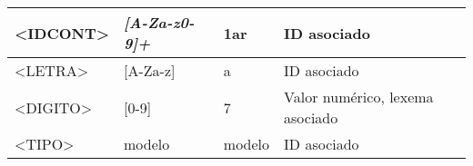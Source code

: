 \begin{landscape}
\begin{longtable}{| p{0.2\textheight} | p{0.75\textheight} | p{0.2\textheight} | p{0.25\textheight} |}
        <IDCONT>                       & \textit{[A-Za-z0-9]+}                                                                                                                                                                                                                                                                                                                                                                                                                                                                                                                                        & 1ar           & ID asociado                                                            \\\hline
        <LETRA>                        & [A-Za-z]                                                                                                                                                                                                                                                                                                                                                                                                                                                                                                                                                     & a             & ID asociado                                                            \\\hline
        <DIGITO>                       & [0-9]                                                                                                                                                                                                                                                                                                                                                                                                                                                                                                                                                        & 7             & Valor numérico, lexema asociado                                        \\\hline
        <TIPO>                         & modelo                                                                                                                                                                                                                                                                                                                                                                                                                                                                                                                                                       & modelo        & ID asociado                                                            \\\hline

\end{longtable}
\end{landscape}
